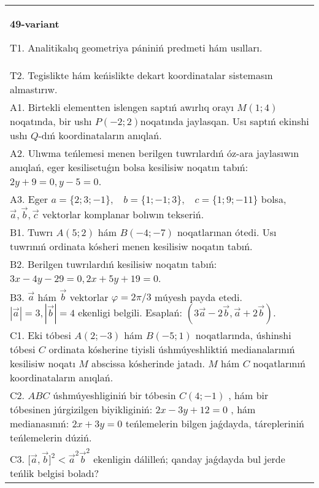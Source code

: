 \documentclass{article}
\begin{document}
\begin{tabular}{m{17cm}}
\textbf{49-variant}
\newline

T1. Analitikalıq geometriya pániniń predmeti hám usılları. 
 \\
T2. Tegislikte hám keńislikte dekart koordinatalar sistemasın almastırıw. 
 \\
A1. 
Birtekli elementten islengen saptıń awırlıq orayı
$M(1;4)$ noqatında, bir ushı $P(-2;2)$noqatında jaylasqan. Usı
saptıń ekinshi ushı $Q$-dıń koordinataların anıqlań.
 \\
A2. 
Ulıwma teńlemesi menen berilgen tuwrılardıń      
óz-ara jaylasıwın anıqlań, eger kesilisetuǵın bolsa kesilisiw noqatın
tabıń: $2y+9=0, y-5=0$.
 \\
A3. 
Eger \(a = \{ 2;3; - 1\},\ \ \ \ b = \{ 1; - 1;3\},\ \ \ \ c = \{ 1;9; - 11\}\) bolsa, $\overrightarrow{a}, \overrightarrow{b}, \overrightarrow{c}$ vektorlar komplanar bolıwın tekseriń.
 \\
B1. 
Tuwrı \(A(5;2)\) hám \(B( -4; -7)\) noqatlarınan ótedi.
Usı tuwrınıń ordinata kósheri menen kesilisiw noqatın tabıń.
 \\
B2. Berilgen tuwrılardıń kesilisiw noqatın tabıń: 
\(3x-4y-29=0, 2x+5y+19=0\).
 \\
B3. 
$\vec{a}$ hám $\vec{b}$ vektorlar $\varphi = 2\pi/3$ múyesh payda etedi. $|\vec{a}| = 3,|\vec{b}| = 4$ ekenligi belgili. Esaplań: 
$\left(3\vec{a} - 2\vec{b},\vec{a} + 2\vec{b} \right)$.
 \\
C1. 
Eki tóbesi \(A(2; - 3)\) hám \(B( - 5;1)\) noqatlarında,
úshinshi tóbesi $C$ ordinata kósherine tiyisli úshmúyeshliktiń
medianalarınıń kesilisiw noqatı $M$ abscissa kósherinde jatadı.
$M$ hám $C$ noqatlarınıń koordinataların anıqlań.
 \\
C2. 
$ABC$ úshmúyeshliginiń bir tóbesin \(C(4; - 1)\) , hám
bir tóbesinen júrgizilgen biyikliginiń: \(2x - 3y + 12 = 0\) , hám
medianasınıń: \(2x + 3y = 0\) teńlemelerin bilgen jaǵdayda, tárepleriniń
teńlemelerin dúziń.
 \\
C3. 
\(\lbrack\vec{a},\vec{b}\rbrack^{2} <  {\vec{a}}^{2}{\vec{b}}^{2}\) ekenligin dálilleń; qanday jaǵdayda bul jerde teńlik belgisi boladı?
 \\

\end{tabular}
\vspace{1cm}
\end{document}
